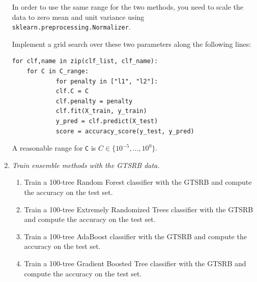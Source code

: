 \documentclass[a4paper,12pt]{scrartcl}
\newcommand{\python}{{\fbox{\texttt{\bfseries python}}\quad}}
\begin{document}
\begin{enumerate}
	In order to use the same range for the two methods, you need to scale the data to
	zero mean and unit variance using \verb+sklearn.preprocessing.Normalizer+.
	
	Implement
	a grid search over these two parameters along the following lines:
	\begin{verbatim}
for clf,name in zip(clf_list, clf_name):
    for C in C_range:
		    for penalty in ["l1", "l2"]:
            clf.C = C
            clf.penalty = penalty
            clf.fit(X_train, y_train)
            y_pred = clf.predict(X_test)
            score = accuracy_score(y_test, y_pred)
\end{verbatim}
A reasonable range for \verb+C+ is $C\in\{10^{-5},...,10^{0}\}$.

\item \python \emph{Train ensemble methods with the GTSRB data.}

\begin{enumerate}
\item Train a 100-tree Random Forest classifier with the GTSRB and compute the accuracy on the test set.
\item Train a 100-tree Extremely Randomized Trees classifier with the GTSRB and compute the accuracy on the test set.
\item Train a 100-tree AdaBoost classifier with the GTSRB and compute the accuracy on the test set.
\item Train a 100-tree Gradient Boosted Tree classifier with the GTSRB and compute the accuracy on the test set.
\end{enumerate}


\end{enumerate}
\end{document}
